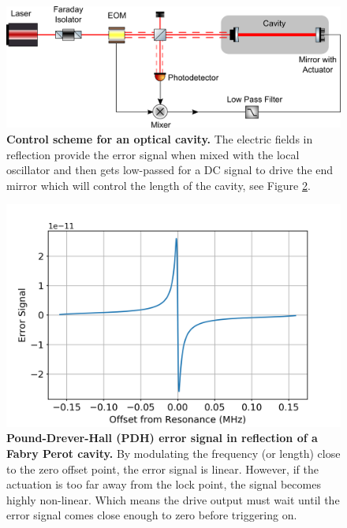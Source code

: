 		\begin{figure}[h]
		\centering
		\includegraphics[width=.75 \textwidth]{../Figures/FP_Control.png}
		\caption[Control scheme for an optical cavity.]{\textbf{Control scheme for an optical cavity.} The electric fields in reflection provide the error signal when mixed with the local oscillator and then gets low-passed for a DC signal to drive the end mirror which will control the length of the cavity, see Figure \ref{fig:FP_err}.}
		\label{fig:FPControl}
		\end{figure}
	
		\begin{figure}[h]
		\centering
		\includegraphics[width=.75 \textwidth]{../Figures/PDH_Err.png}
		\caption[Error signal in reflection]{\textbf{Pound-Drever-Hall (PDH) error signal in reflection of a Fabry Perot cavity.}  By modulating the frequency (or length) close to the zero offset point, the error signal is linear.  However, if the actuation is too far away from the lock point, the signal becomes highly non-linear.  Which means the drive output must wait until the error signal comes close enough to zero before triggering on. }
		\label{fig:FP_err}
		\end{figure}
	
		
